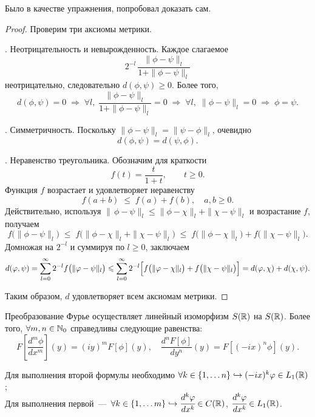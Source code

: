 \begin{note}
Было в качестве упражнения, попробовал доказать сам.
\end{note}
\begin{proof}
Проверим три аксиомы метрики.

\medskip
{}. Неотрицательность и невырожденность.
Каждое слагаемое 
\[
2^{-l}\,\frac{\|\phi-\psi\|_l}{1+\|\phi-\psi\|_l}
\]
неотрицательно, следовательно $d(\phi,\psi)\ge0$. Более того, 
\[
d(\phi,\psi)=0
\;\Longrightarrow\;
\forall l,\;\frac{\|\phi-\psi\|_l}{1+\|\phi-\psi\|_l}=0
\;\Longrightarrow\;
\forall l,\;\|\phi-\psi\|_l=0
\;\Longrightarrow\;
\phi=\psi.
\]

\medskip
{}. Симметричность.
Поскольку $\|\phi-\psi\|_l=\|\psi-\phi\|_l$, очевидно
\[
d(\phi,\psi)=d(\psi,\phi).
\]

\medskip
{}. Неравенство треугольника.
Обозначим для краткости 
\[
f(t)=\frac{t}{1+t},\qquad t\ge0.
\]
Функция $f$ возрастает и удовлетворяет неравенству
\[
f(a+b)\;\le\;f(a)+f(b),
\quad a,b\ge0.
\]
Действительно, используя
\(\|\,\phi-\psi\|_l\le\|\phi-\chi\|_l+\|\chi-\psi\|_l\) и возрастание $f$, получаем
\[
f\bigl(\|\phi-\psi\|_l\bigr)
\;\le\;
f\bigl(\|\phi-\chi\|_l+\|\chi-\psi\|_l\bigr)
\;\le\;
f\bigl(\|\phi-\chi\|_l\bigr)
+f\bigl(\|\chi-\psi\|_l\bigr).
\]
Домножая на $2^{-l}$ и суммируя по $l\ge0$, заключаем
\[
d(\phi,\psi)
=\sum_{l=0}^\infty2^{-l}f\bigl(\|\phi-\psi\|_l\bigr)
\le
\sum_{l=0}^\infty2^{-l}\Bigl[f\bigl(\|\phi-\chi\|_l\bigr)
+f\bigl(\|\chi-\psi\|_l\bigr)\Bigr]
=d(\phi,\chi)+d(\chi,\psi).
\]

Таким образом, $d$ удовлетворяет всем аксиомам метрики.
\end{proof}
\begin{theorem}
    Преобразование Фурье осуществляет линейный изоморфизм $S(\R)$ на $S(\R)$.
    Более того, $\forall m, n \in \N_0$ справедливы следующие равенства:
    \[
        F\left[\dfrac{d^m \phi}{dx^m}\right](y) = (iy)^m F[\phi](y), \quad \dfrac{d^n F[\phi]}{dy^n}(y) = F[(-ix)^n \phi](y).
    \]
\end{theorem}

\begin{remark}
    Для выполнения второй формулы необходимо $\forall k \in \{1, \ldots n\} \hookrightarrow (-ix)^k \phi \in L_1 (\R)$;\\
    Для выполнения первой~---~$\forall k \in \{1, \ldots m\} \hookrightarrow \cfrac{d^k \phi}{dx^k} \in C(\R)$, $\cfrac{d^k \phi}{dx^k} \in L_1 (\R)$.
\end{remark}

